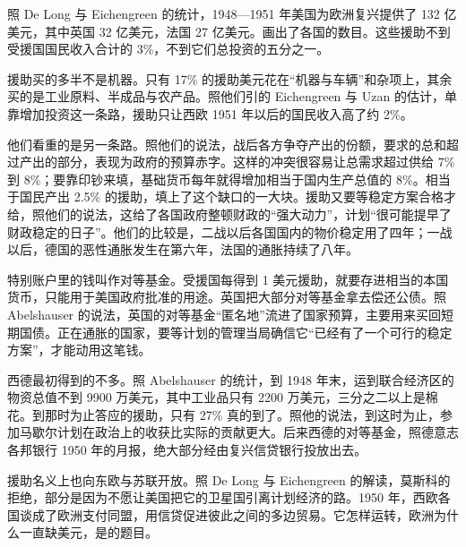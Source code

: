 照 De Long 与 Eichengreen 的统计，1948—1951 年美国为欧洲复兴提供了 132 亿美元，其中英国 32 亿美元，法国 27 亿美元\cite{delong1991}。画出了各国的数目。这些援助不到受援国国民收入合计的 3\%，不到它们总投资的五分之一\cite{delong1991}。

援助买的多半不是机器。只有 17\% 的援助美元花在“机器与车辆”和杂项上，其余买的是工业原料、半成品与农产品\cite{delong1991}。照他们引的 Eichengreen 与 Uzan 的估计，单靠增加投资这一条路，援助只让西欧 1951 年以后的国民收入高了约 2\%\cite{delong1991}。

他们看重的是另一条路。照他们的说法，战后各方争夺产出的份额，要求的总和超过产出的部分，表现为政府的预算赤字\cite{delong1991}。这样的冲突很容易让总需求超过供给 7\% 到 8\%；要靠印钞来填，基础货币每年就得增加相当于国内生产总值的 8\%\cite{delong1991}。相当于国民产出 2.5\% 的援助，填上了这个缺口的一大块\cite{delong1991}。援助又要等稳定方案合格才给，照他们的说法，这给了各国政府整顿财政的“强大动力”，计划“很可能提早了财政稳定的日子”\cite{delong1991}。他们的比较是，二战以后各国国内的物价稳定用了四年；一战以后，德国的恶性通胀发生在第六年，法国的通胀持续了八年\cite{delong1991}。

特别账户里的钱叫作对等基金。受援国每得到 1 美元援助，就要存进相当的本国货币，只能用于美国政府批准的用途\cite{delong1991}。英国把大部分对等基金拿去偿还公债\cite{delong1991}。照 Abelshauser 的说法，英国的对等基金“匿名地”流进了国家预算，主要用来买回短期国债\cite{abelshauser1981}。正在通胀的国家，要等计划的管理当局确信它“已经有了一个可行的稳定方案”，才能动用这笔钱\cite{delong1991}。

西德最初得到的不多。照 Abelshauser 的统计，到 1948 年末，运到联合经济区的物资总值不到 9900 万美元，其中工业品只有 2200 万美元，三分之二以上是棉花\cite{abelshauser1981}。到那时为止答应的援助，只有 27\% 真的到了\cite{abelshauser1981}。照他的说法，到这时为止，参加马歇尔计划在政治上的收获比实际的贡献更大\cite{abelshauser1981}。后来西德的对等基金，照德意志各邦银行 1950 年的月报，绝大部分经由复兴信贷银行投放出去\cite{bdl1950}。

援助名义上也向东欧与苏联开放。照 De Long 与 Eichengreen 的解读，莫斯科的拒绝，部分是因为不愿让美国把它的卫星国引离计划经济的路\cite{delong1991}。1950 年，西欧各国谈成了欧洲支付同盟，用信贷促进彼此之间的多边贸易\cite{delong1991}。它怎样运转，欧洲为什么一直缺美元，是的题目。

